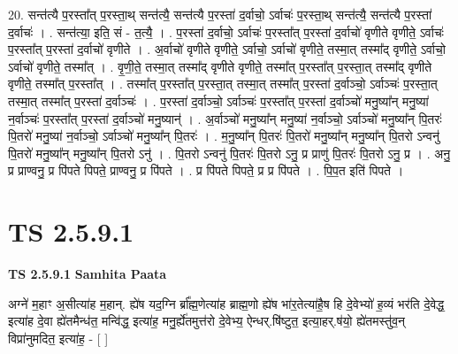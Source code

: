 \documentclass[17pt]{extarticle}
\begin{document}
20. सन्त॑त्यै प॒रस्ता᳚त् प॒रस्ता॒थ् सन्त॑त्यै॒ सन्त॑त्यै प॒रस्ता॑ द॒र्वाचो॒ ऽर्वाचः॑ प॒रस्ता॒थ् सन्त॑त्यै॒ सन्त॑त्यै प॒रस्ता॑ द॒र्वाचः॑ । . सन्त॑त्या॒ इति॒ सं - त॒त्यै॒ । . प॒रस्ता॑ द॒र्वाचो॒ ऽर्वाचः॑ प॒रस्ता᳚त् प॒रस्ता॑ द॒र्वाचो॑ वृणीते वृणीते॒ ऽर्वाचः॑ प॒रस्ता᳚त् प॒रस्ता॑ द॒र्वाचो॑ वृणीते । . अ॒र्वाचो॑ वृणीते वृणीते॒ ऽर्वाचो॒ ऽर्वाचो॑ वृणीते॒ तस्मा॒त् तस्मा᳚द् वृणीते॒ ऽर्वाचो॒ ऽर्वाचो॑ वृणीते॒ तस्मा᳚त् । . वृ॒णी॒ते॒ तस्मा॒त् तस्मा᳚द् वृणीते वृणीते॒ तस्मा᳚त् प॒रस्ता᳚त् प॒रस्ता॒त् तस्मा᳚द् वृणीते वृणीते॒ तस्मा᳚त् प॒रस्ता᳚त् । . तस्मा᳚त् प॒रस्ता᳚त् प॒रस्ता॒त् तस्मा॒त् तस्मा᳚त् प॒रस्ता॑ द॒र्वाञ्चो॒ ऽर्वाञ्चः॑ प॒रस्ता॒त् तस्मा॒त् तस्मा᳚त् प॒रस्ता॑ द॒र्वाञ्चः॑ । . प॒रस्ता॑ द॒र्वाञ्चो॒ ऽर्वाञ्चः॑ प॒रस्ता᳚त् प॒रस्ता॑ द॒र्वाञ्चो॑ मनु॒ष्या᳚न् मनु॒ष्या॑ न॒र्वाञ्चः॑ प॒रस्ता᳚त् प॒रस्ता॑ द॒र्वाञ्चो॑ मनु॒ष्यान्॑ । . अ॒र्वाञ्चो॑ मनु॒ष्या᳚न् मनु॒ष्या॑ न॒र्वाञ्चो॒ ऽर्वाञ्चो॑ मनु॒ष्या᳚न् पि॒तरः॑ पि॒तरो॑ मनु॒ष्या॑ न॒र्वाञ्चो॒ ऽर्वाञ्चो॑ मनु॒ष्या᳚न् पि॒तरः॑ । . म॒नु॒ष्या᳚न् पि॒तरः॑ पि॒तरो॑ मनु॒ष्या᳚न् मनु॒ष्या᳚न् पि॒तरो ऽन्वनु॑ पि॒तरो॑ मनु॒ष्या᳚न् मनु॒ष्या᳚न् पि॒तरो ऽनु॑ । . पि॒तरो ऽन्वनु॑ पि॒तरः॑ पि॒तरो ऽनु॒ प्र प्राणु॑ पि॒तरः॑ पि॒तरो ऽनु॒ प्र । . अनु॒ प्र प्राण्वनु॒ प्र पि॑पते पिपते॒ प्राण्वनु॒ प्र पि॑पते । . प्र पि॑पते पिपते॒ प्र प्र पि॑पते । . पि॒प॒त इति॑ पिपते । \newline
\pagebreak
{}
\section*{ TS 2.5.9.1 }

\textbf{TS 2.5.9.1 } \newline
\textbf{Samhita Paata} \newline

अग्ने॑ म॒हाꣳ अ॒सीत्या॑ह म॒हान्. ह्ये॑ष यद॒ग्नि र्ब्रा᳚ह्म॒णेत्या॑ह ब्राह्म॒णो ह्ये॑ष भा॑र॒तेत्या॑है॒ष हि दे॒वेभ्यो॑ ह॒व्यं भर॑ति दे॒वेद्ध॒ इत्या॑ह दे॒वा ह्ये॑तमैन्ध॑त॒ मन्वि॑द्ध॒ इत्या॑ह॒ मनु॒र्ह्ये॑तमुत्त॑रो दे॒वेभ्य॒ ऐन्धर्.षि॑ष्टुत॒ इत्या॒हर्.ष॑यो॒ ह्ये॑तमस्तु॑व॒न् विप्रा॑नुमदित॒ इत्या॑ह॒ - [  ] \newline
\end{document}
